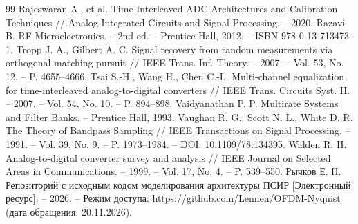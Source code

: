 \documentclass[a4paper,12pt]{article}
\numberwithin{equation}{section}
\begin{document}
\begin{thebibliography}{99}
Rajeswaran A., et al. Time-Interleaved ADC Architectures and Calibration Techniques // Analog Integrated Circuits and Signal Processing. -- 2020.
Razavi B. RF Microelectronics. -- 2nd ed. -- Prentice Hall, 2012. -- ISBN 978-0-13-713473-1.
Tropp J. A., Gilbert A. C. Signal recovery from random measurements via orthogonal matching pursuit // IEEE Trans. Inf. Theory. -- 2007. -- Vol. 53, No. 12. -- P. 4655--4666.
Tsai S.-H., Wang H., Chen C.-L. Multi-channel equalization for time-interleaved analog-to-digital converters // IEEE Trans. Circuits Syst. II. -- 2007. -- Vol. 54, No. 10. -- P. 894--898.
Vaidyanathan P. P. Multirate Systems and Filter Banks. -- Prentice Hall, 1993.
Vaughan R. G., Scott N. L., White D. R. The Theory of Bandpass Sampling // IEEE Transactions on Signal Processing. -- 1991. -- Vol. 39, No. 9. -- P. 1973--1984. -- DOI: 10.1109/78.134395.
Walden R. H. Analog-to-digital converter survey and analysis // IEEE Journal on Selected Areas in Communications. -- 1999. -- Vol. 17, No. 4. -- P. 539--550.
Рычков Е. Н. Репозиторий с исходным кодом моделирования архитектуры ПСИР [Электронный ресурс]. -- 2026. -- Режим доступа: \url{https://github.com/Lennen/OFDM-Nyquist} (дата обращения: 20.11.2026).

\end{thebibliography}
\end{document}

